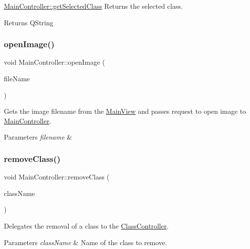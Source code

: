\hyperlink{classMainController_a1ffca82d85f234d7427385dd28bb2160}{Main\+Controller\+::get\+Selected\+Class} Returns the selected class. 

\begin{DoxyReturn}{Returns}
Q\+String 
\end{DoxyReturn}
\mbox{\label{classMainController_a44cb414d5932db864383b9cb17c6f0b1}} 
\subsubsection{\texorpdfstring{open\+Image()}{openImage()}}
{\footnotesize\ttfamily void Main\+Controller\+::open\+Image (\begin{DoxyParamCaption}\item[{const Q\+String \&}]{file\+Name }\end{DoxyParamCaption})}



Gets the image filename from the \hyperlink{classMainView}{Main\+View} and passes request to open image to \hyperlink{classMainController}{Main\+Controller}. 


\begin{DoxyParams}{Parameters}
{\em filename} & \\
\hline
\end{DoxyParams}
\mbox{\label{classMainController_ad639a2fd588d6fe011701a5168184883}} 
\subsubsection{\texorpdfstring{remove\+Class()}{removeClass()}}
{\footnotesize\ttfamily void Main\+Controller\+::remove\+Class (\begin{DoxyParamCaption}\item[{const Q\+String \&}]{class\+Name }\end{DoxyParamCaption})}



Delegates the removal of a class to the \hyperlink{classClassController}{Class\+Controller}. 


\begin{DoxyParams}{Parameters}
{\em class\+Name} & Name of the class to remove. \\
\hline
\end{DoxyParams}
\mbox{\label{classMainController_aa2b2e86d0134c9bb413d74efdd926211}} 
